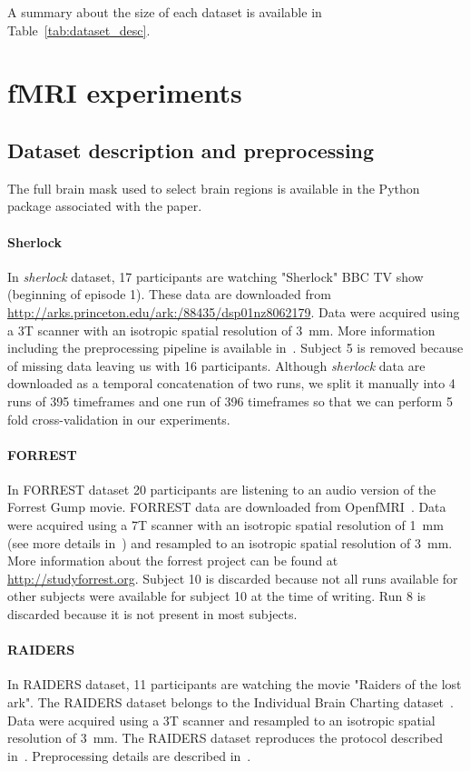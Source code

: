 A summary about the size of each dataset is available in Table~\ref{tab:dataset_desc}.


\section{fMRI experiments}
\label{sec:app_expts}
\subsection{Dataset description and preprocessing}
\label{preprocessing}
The full brain mask used to select brain regions is available in the Python package associated with the paper.

\paragraph{Sherlock}
In \emph{sherlock} dataset, 17 participants are watching "Sherlock" BBC TV show (beginning of episode 1). 
%
These data are downloaded from \url{http://arks.princeton.edu/ark:/88435/dsp01nz8062179}. 
%
Data were acquired using a 3T scanner with an isotropic spatial resolution of 3 mm. 
%
More information including the preprocessing pipeline is available in~\cite{chen2017shared}.
%
Subject 5 is removed because of missing data leaving us with 16 participants.
%
Although \emph{sherlock} data are downloaded as a temporal concatenation of two runs, we split it manually into 4 runs of 395 timeframes and one run of 396 timeframes so that we can perform 5 fold cross-validation in our experiments.


\paragraph{FORREST}
In FORREST dataset 20 participants are listening to an audio version of the Forrest Gump  movie.
%
FORREST data are downloaded from OpenfMRI~\cite{poldrack2013toward}. 
%
Data were acquired using a 7T scanner with an isotropic spatial resolution of 1~mm (see more details in~\cite{hanke2014high}) and resampled to an isotropic spatial resolution of 3~mm.
%
More information about the forrest project can be found at \url{http://studyforrest.org}.
%
Subject 10 is discarded because not all runs available for other subjects were available for subject 10 at the time of writing.
%
Run 8 is discarded because it is not present in most subjects.
 
\paragraph{RAIDERS}
In RAIDERS dataset, 11 participants are watching the movie "Raiders of the lost ark".
% 
The RAIDERS dataset belongs to the Individual Brain Charting dataset~\cite{ibc}.
% 
Data were acquired using a 3T scanner and resampled to an isotropic spatial resolution of 3~mm.
% 
The RAIDERS dataset reproduces the protocol described in~\cite{haxby2011common}.
%
Preprocessing details are described in~\cite{ibc}.

